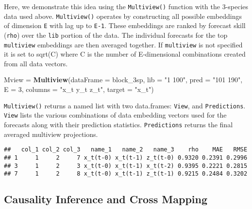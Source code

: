 \documentclass[]{article}
\newenvironment{Shaded}{\begin{snugshade}}{\end{snugshade}}
\newcommand{\DataTypeTok}[1]{\textcolor[rgb]{0.13,0.29,0.53}{#1}}
\newcommand{\DecValTok}[1]{\textcolor[rgb]{0.00,0.00,0.81}{#1}}
\newcommand{\FloatTok}[1]{\textcolor[rgb]{0.00,0.00,0.81}{#1}}
\newcommand{\KeywordTok}[1]{\textcolor[rgb]{0.13,0.29,0.53}{\textbf{#1}}}
\newcommand{\NormalTok}[1]{#1}
\newcommand{\OperatorTok}[1]{\textcolor[rgb]{0.81,0.36,0.00}{\textbf{#1}}}
\newcommand{\StringTok}[1]{\textcolor[rgb]{0.31,0.60,0.02}{#1}}
\begin{document}
Here, we demonstrate this idea using the \texttt{Multiview()} function
with the 3-species data used above. \texttt{Multiview()} operates by
constructing all possible embeddings of dimension \texttt{E} with lag up
to \texttt{E-1}. These embeddings are ranked by forecast skill
(\texttt{rho}) over the \texttt{lib} portion of the data. The individual
forecasts for the top \texttt{multiview} embeddings are then averaged
together. If \texttt{multiview} is not specified it is set to sqrt(C)
where C is the number of E-dimensional combinations created from all
data vectors.

\begin{Shaded}
\begin{Highlighting}[]
\NormalTok{Mview =}\StringTok{ }\KeywordTok{Multiview}\NormalTok{(}\DataTypeTok{dataFrame =}\NormalTok{ block_3sp, }\DataTypeTok{lib =} \StringTok{"1 100"}\NormalTok{, }\DataTypeTok{pred =} \StringTok{"101 190"}\NormalTok{, }\DataTypeTok{E =} \DecValTok{3}\NormalTok{, }
    \DataTypeTok{columns =} \StringTok{"x_t y_t z_t"}\NormalTok{, }\DataTypeTok{target =} \StringTok{"x_t"}\NormalTok{)}
\end{Highlighting}
\end{Shaded}

\texttt{Multiview()} returns a named list with two data.frames:
\texttt{View}, and \texttt{Predictions}. \texttt{View} lists the various
combinations of data embedding vectors used for the forecasts along with
their prediction statistics. \texttt{Predictions} returns the final
averaged multiview projections.

\begin{Shaded}
\end{Shaded}

\begin{verbatim}
##   col_1 col_2 col_3   name_1   name_2   name_3    rho    MAE   RMSE
## 1     1     2     7 x_t(t-0) x_t(t-1) z_t(t-0) 0.9320 0.2391 0.2996
## 3     1     2     3 x_t(t-0) x_t(t-1) x_t(t-2) 0.9395 0.2221 0.2815
## 7     1     2     8 x_t(t-0) x_t(t-1) z_t(t-1) 0.9215 0.2484 0.3202
\end{verbatim}

\newpage

\hypertarget{causality-inference-and-cross-mapping}{%
\subsection{Causality Inference and Cross
Mapping}\label{causality-inference-and-cross-mapping}}
\end{document}
